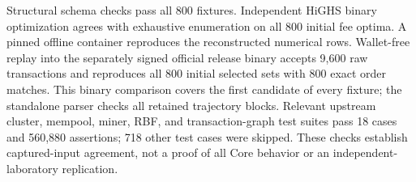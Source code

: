 Structural schema checks pass all 800 fixtures. Independent HiGHS binary optimization agrees with exhaustive enumeration on all 800 initial fee optima. A pinned offline container reproduces the reconstructed numerical rows. Wallet-free replay into the separately signed official release binary accepts 9,600 raw transactions and reproduces all 800 initial selected sets with 800 exact order matches. This binary comparison covers the first candidate of every fixture; the standalone parser checks all retained trajectory blocks. Relevant upstream cluster, mempool, miner, RBF, and transaction-graph test suites pass 18 cases and 560,880 assertions; 718 other test cases were skipped. These checks establish captured-input agreement, not a proof of all Core behavior or an independent-laboratory replication.
